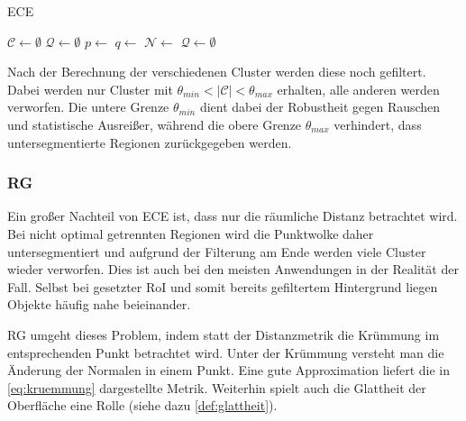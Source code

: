 \begin{algorithm}[H]
\caption[\acl{ECE}]{\acl{ECE} \cite[89--90]{RusuDoctoralDissertation}}
\label{alg:euclidean-cluster-extraction}
\begin{algorithmic}
\State $\mathcal{C} \gets \emptyset$
\State $\mathcal{Q} \gets \emptyset$
	\State $p \gets$ 
	\State {}
		\State $q \gets$ 
		\State $\mathcal{N} \gets$ 
		\State {}
		\State {}
	\EndWhile
	\State {}
	\State $\mathcal{Q} \gets \emptyset$
\EndWhile
\State {}
\end{algorithmic}
\end{algorithm}

Nach der Berechnung der verschiedenen Cluster werden diese noch gefiltert.
Dabei werden nur Cluster mit $\theta_{min} < |\mathcal{C}| < \theta_{max}$ erhalten, alle anderen werden verworfen.
Die untere Grenze $\theta_{min}$ dient dabei der Robustheit gegen Rauschen und statistische Ausreißer, während die obere Grenze $\theta_{max}$ verhindert, dass untersegmentierte Regionen zurückgegeben werden.

\subsubsection{\acl{RG}}
\label{subsubsec:region-growing}

Ein großer Nachteil von \ac{ECE} ist, dass nur die räumliche Distanz betrachtet wird.
Bei nicht optimal getrennten Regionen wird die Punktwolke daher untersegmentiert und aufgrund der Filterung am Ende werden viele Cluster wieder verworfen.
Dies ist auch bei den meisten Anwendungen in der Realität der Fall.
Selbst bei gesetzter \ac{RoI} und somit bereits gefiltertem Hintergrund liegen Objekte häufig nahe beieinander.

\ac{RG} umgeht dieses Problem, indem statt der Distanzmetrik die Krümmung im entsprechenden Punkt betrachtet wird.
Unter der Krümmung versteht man die Änderung der Normalen in einem Punkt.
Eine gute Approximation liefert die in \autoref{eq:kruemmung} dargestellte Metrik.
Weiterhin spielt auch die Glattheit der Oberfläche eine Rolle (siehe dazu \autoref{def:glattheit}).

